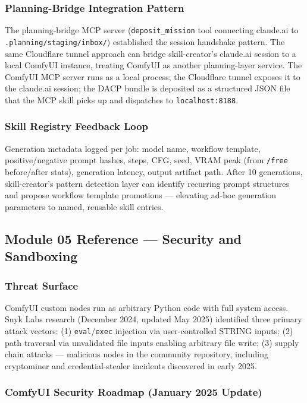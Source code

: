 \documentclass[11pt,letterpaper]{article}
\begin{document}
\subsubsection{Planning-Bridge Integration Pattern}

The planning-bridge MCP server (\texttt{deposit\_mission} tool connecting claude.ai to
\texttt{.planning/staging/inbox/}) established the session handshake pattern. The same
Cloudflare tunnel approach can bridge skill-creator's claude.ai session to a local
ComfyUI instance, treating ComfyUI as another planning-layer service. The ComfyUI MCP
server runs as a local process; the Cloudflare tunnel exposes it to the claude.ai
session; the DACP bundle is deposited as a structured JSON file that the MCP skill
picks up and dispatches to \texttt{localhost:8188}.

\subsubsection{Skill Registry Feedback Loop}

Generation metadata logged per job: model name, workflow template, positive/negative
prompt hashes, steps, CFG, seed, VRAM peak (from \texttt{/free} before/after stats),
generation latency, output artifact path. After 10 generations, skill-creator's
pattern detection layer can identify recurring prompt structures and propose workflow
template promotions --- elevating ad-hoc generation parameters to named, reusable
skill entries.

\subsection{Module 05 Reference --- Security and Sandboxing}

\subsubsection{Threat Surface}

ComfyUI custom nodes run as arbitrary Python code with full system access. Snyk Labs
research (December 2024, updated May 2025) identified three primary attack vectors:
(1) \texttt{eval}/\texttt{exec} injection via user-controlled STRING inputs; (2) path
traversal via unvalidated file inputs enabling arbitrary file write; (3) supply chain
attacks --- malicious nodes in the community repository, including cryptominer and
credential-stealer incidents discovered in early 2025.

\subsubsection{ComfyUI Security Roadmap (January 2025 Update)}
\end{document}

